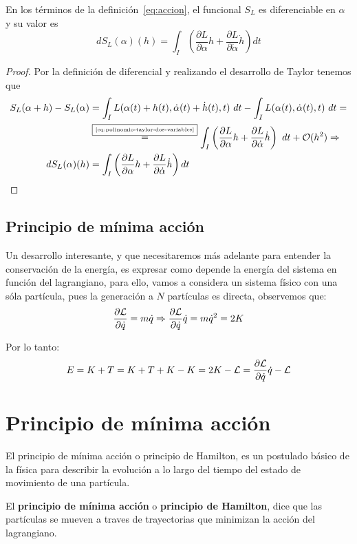 \begin{proposition}
	En los términos de la definición~\eqref{eq:accion}, el funcional $S_L$ es diferenciable en $\alpha$ y su valor es
	\begin{equation}
		\label{eq:accion_diferencial}
		dS_L(\alpha)(h)=\int_{I}\left( \frac{\partial L}{\partial\alpha}h+\frac{\partial L}{\partial\dot{\alpha}}\dot{h}\right) dt
	\end{equation}
\end{proposition}
\begin{proof}
	Por la definición de diferencial y realizando el desarrollo de Taylor tenemos que
	\begin{equation*}
		\begin{split}
			S_L(\alpha + h) -  S_L(\alpha)& = \int_{I}L(\alpha(t)+h(t), \dot{\alpha}(t)+\dot{h}(t), t)\ dt - \int_{I}L(\alpha(t), \dot{\alpha}(t), t)\ dt =\\
			&\overset{\fbox{\tiny \ref{eq:polinomio-taylor-dos-variables}}}{=}\int_{I}\left( \frac{\partial L}{\partial\alpha}h+\frac{\partial L}{\partial\dot{\alpha}}\dot{h}\right)\ dt+\mathcal{O}(h^2)\Rightarrow\\
			dS_L(\alpha)(h) &=\int_{I}\left( \frac{\partial L}{\partial\alpha}h+\frac{\partial L}{\partial\dot{\alpha}}\dot{h}\right) dt
		\end{split}
	\end{equation*}
\end{proof}


\subsection{Principio de mínima acción}
Un desarrollo interesante, y que necesitaremos más adelante para entender la conservación de la energía, es expresar como depende la energía del sistema en función del lagrangiano, para ello, vamos a considera un sistema físico con una sóla partícula, pues la generación a $N$ partículas es directa, observemos que:
\begin{equation*}
	\frac{\partial\mathcal{L}}{\partial\dot{q}} =m\dot{q}\Rightarrow \frac{\partial\mathcal{L}}{\partial\dot{q}}\dot{q} =m\dot{q}^2 = 2K
\end{equation*}

Por lo tanto:
\begin{equation}
	\label{eq:energia-lagrangiana}
	E=K+T=K+T+K-K=2K-\mathcal{L}=\frac{\partial\mathcal{L}}{\partial\dot{q}}\dot{q}-\mathcal{L}
\end{equation}

\section{Principio de mínima acción}\label{sec:principio-de-minima-accion}

El principio de mínima acción o principio de Hamilton, es un postulado básico de la física para describir la evolución a lo largo del tiempo del estado de movimiento de una partícula.

El \textbf{principio de mínima acción} o \textbf{principio de Hamilton}, dice que las partículas se mueven a traves de trayectorias que minimizan la acción del lagrangiano.
